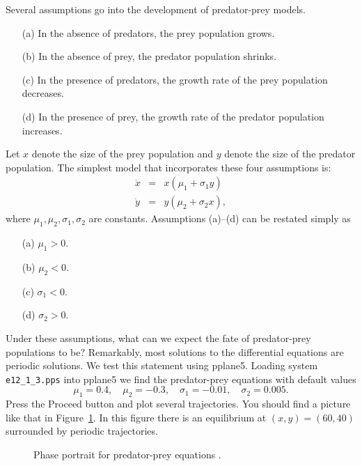 \documentclass{ximera}
\begin{document}
Several assumptions go into the development of predator-prey 
models. 
\begin{itemize}
\item[(a)]  In the absence of predators, the prey population
grows.
\item[(b)]  In the absence of prey, the predator population 
shrinks.
\item[(c)]  In the presence of predators, the growth rate of
the prey population decreases.
\item[(d)]  In the presence of prey, the growth rate of the 
predator population increases.
\end{itemize}
Let $x$ denote the size of the prey population
 and $y$ denote 
the size of the predator population.  
The simplest model that 
incorporates these four assumptions is:
\begin{equation*} \label{e:PP}
\begin{array}{lcr}
\dot{x} & = & x(\mu_1 + \sigma_1y)\; \\
\dot{y} & = & y(\mu_2 + \sigma_2x),
\end{array}
\end{equation*}
where $\mu_1,\mu_2,\sigma_1,\sigma_2$ are constants.  Assumptions
(a)--(d) can be restated simply as 
\begin{itemize}
\item[(a)]  $\mu_1 > 0$.
\item[(b)]  $\mu_2 < 0$.
\item[(c)]  $\sigma_1 < 0$.
\item[(d)]  $\sigma_2 > 0$.
\end{itemize}
  
Under these assumptions, what can we expect the fate of predator-prey 
populations to be?  Remarkably, most solutions to the differential equations 
 are periodic solutions.  
We test this statement using 
{\sf pplane5}.   
Loading system {\tt e12\_1\_3.pps} into {\sf pplane5}
we find the predator-prey equations with default values
\[
\mu_1 = 0.4, \quad \mu_2 = -0.3, \quad \sigma_1 = -0.01, \quad \sigma_2 = 0.005.
\]
Press the {\sf Proceed} button and plot several trajectories.  You
should find a picture like that in Figure~\ref{F:PP1}.  In this figure 
there is an equilibrium at $(x,y)=(60,40)$ surrounded by periodic 
trajectories. 

\begin{figure}[htb]
           \centerline{%
	   }
           \caption{Phase portrait for predator-prey equations 
		\protect{}.}
           \label{F:PP1}
\end{figure}
\end{document}

